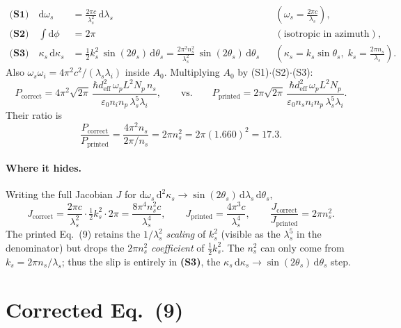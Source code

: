 \documentclass[11pt]{article}
\newcommand{\dd}{\mathrm{d}}
\begin{document}
\begin{align}
\textbf{(S1)}\quad
\dd\omega_s &= \frac{2\pi c}{\lambda_s^2}\,\dd\lambda_s
&&\left(\omega_s=\tfrac{2\pi c}{\lambda_s}\right),\\[4pt]
\textbf{(S2)}\quad
\int \dd\phi &= 2\pi
&&(\text{isotropic in azimuth}),\\[4pt]
\textbf{(S3)}\quad
\kappa_s\,\dd\kappa_s
&= \tfrac12 k_s^2\,\sin(2\theta_s)\,\dd\theta_s
= \frac{2\pi^2 n_s^2}{\lambda_s^2}\,\sin(2\theta_s)\,\dd\theta_s
&&\left(\kappa_s=k_s\sin\theta_s,\;
k_s=\tfrac{2\pi n_s}{\lambda_s}\right).
\end{align}
Also $\omega_s\omega_i = 4\pi^2 c^2/(\lambda_s\lambda_i)$ inside $A_0$.
Multiplying $A_0$ by (S1)$\cdot$(S2)$\cdot$(S3):
\begin{equation}
P_{\text{correct}}
= 4\pi^2\sqrt{2\pi}\,
\frac{\hbar d_{\mathrm{eff}}^2\,\omega_p L^2 N_p\, n_s}
{\varepsilon_0 n_i n_p\,\lambda_s^5\lambda_i},
\qquad\text{vs.}\qquad
P_{\text{printed}}
= 2\pi\sqrt{2\pi}\,
\frac{\hbar d_{\mathrm{eff}}^2\,\omega_p L^2 N_p}
{\varepsilon_0 n_s n_i n_p\,\lambda_s^5\lambda_i}.
\end{equation}
Their ratio is
\begin{equation}
\boxed{\;
\frac{P_{\text{correct}}}{P_{\text{printed}}}
= \frac{4\pi^2 n_s}{2\pi/n_s}
= 2\pi n_s^2
= 2\pi(1.660)^2 = 17.3.
\;}
\end{equation}

\paragraph{Where it hides.} Writing the full Jacobian
$J$ for $\dd\omega_s\,\dd^2\kappa_s \to \sin(2\theta_s)\,\dd\lambda_s\,\dd\theta_s$,
\begin{equation}
J_{\text{correct}}=\frac{2\pi c}{\lambda_s^2}\cdot\tfrac12 k_s^2\cdot 2\pi
= \frac{8\pi^4 n_s^2 c}{\lambda_s^4},
\qquad
J_{\text{printed}}=\frac{4\pi^3 c}{\lambda_s^4},
\qquad
\frac{J_{\text{correct}}}{J_{\text{printed}}}=2\pi n_s^2 .
\end{equation}
The printed Eq.~(9) retains the $1/\lambda_s^2$ \emph{scaling} of $k_s^2$
(visible as the $\lambda_s^5$ in the denominator) but drops the
$2\pi n_s^2$ \emph{coefficient} of $\tfrac12 k_s^2$. The $n_s^2$ can only come
from $k_s=2\pi n_s/\lambda_s$; thus the slip is entirely in \textbf{(S3)},
the $\kappa_s\,\dd\kappa_s\to\sin(2\theta_s)\,\dd\theta_s$ step.

\section*{Corrected Eq.~(9)}
\end{document}
